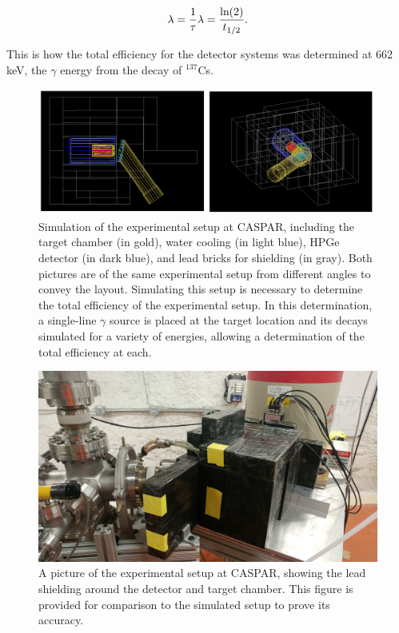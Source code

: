 \begin{equation}
\lambda = \dfrac{1}{\tau} \hfill \lambda = \dfrac{\text{ln}(2)}{t_{1/2}}.
\end{equation}

\noindent This is how the total efficiency for the detector systems was determined at 662 keV, the $\gamma$ energy from the decay of $^{137}$Cs.



\begin{figure}
\centering
\includegraphics[width=\linewidth]{figures/shieldingSimulation.png}
\caption{Simulation of the experimental setup at CASPAR, including the target chamber (in gold), water cooling (in light blue), HPGe detector (in dark blue), and lead bricks for shielding (in gray). Both pictures are of the same experimental setup from different angles to convey the layout. Simulating this setup is necessary to determine the total efficiency of the experimental setup. In this determination, a single-line $\gamma$ source is placed at the target location and its decays simulated for a variety of energies, allowing a determination of the total efficiency at each.}
\label{fig: simulatedSetup}
\end{figure}


\begin{figure}
\centering
\includegraphics[width=0.8\linewidth]{figures/shieldingPicture.jpg}
\caption{A picture of the experimental setup at CASPAR, showing the lead shielding around the detector and target chamber. This figure is provided for comparison to the simulated setup to prove its accuracy. }
\label{fig: actualSetup}
\end{figure} 

